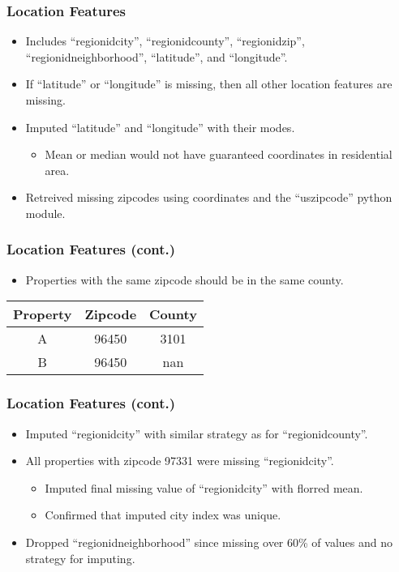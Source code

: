 \documentclass{beamer}
\begin{document}
\begin{frame}
\frametitle{Location Features}
\begin{itemize}
\item Includes ``regionidcity'', ``regionidcounty'', ``regionidzip'', ``regionidneighborhood'', ``latitude'', and ``longitude''.
\item If ``latitude'' or ``longitude'' is missing, then all other location features are missing.
\item Imputed ``latitude'' and ``longitude'' with their modes.
\begin{itemize}
\item Mean or median would not have guaranteed coordinates in residential area.
\end{itemize}
\item Retreived missing zipcodes using coordinates and the ``uszipcode'' python module.
\end{itemize}
\end{frame}

\begin{frame}
\frametitle{Location Features (cont.)}
\begin{itemize}
\item Properties with the same zipcode should be in the same county.
\end{itemize}
\begin{center}
\begin{tabular}{|c|c|c|} \hline
Property & Zipcode & County \\ \hline
A & 96450 & 3101 \\
B & 96450 & nan \\
\hline
\end{tabular}
\end{center}
\end{frame}

\begin{frame}
\frametitle{Location Features (cont.)}
\begin{itemize}
\item Imputed ``regionidcity'' with similar strategy as for ``regionidcounty''.
\item All properties with zipcode 97331 were missing ``regionidcity''.
\begin{itemize}
\item Imputed final missing value of ``regionidcity'' with florred mean.
\item Confirmed that imputed city index was unique.
\end{itemize}
\item Dropped ``regionidneighborhood'' since missing over 60\% of values and no strategy for imputing.
\end{itemize}
\end{frame}
\end{document}
